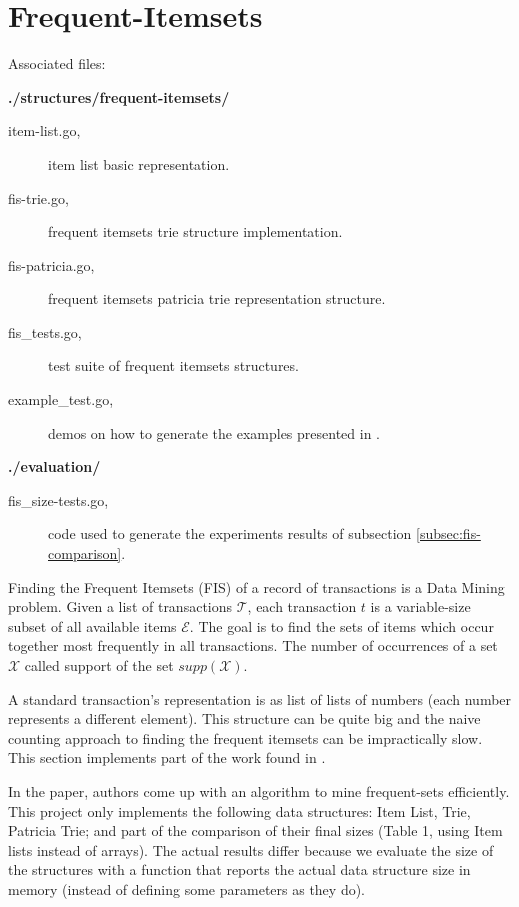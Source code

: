 \documentclass[a4paper,10pt,table,xcdraw]{article}
\begin{document}
\section{Frequent-Itemsets}
\label{sec:fis}

Associated files:

\textbf{./structures/frequent-itemsets/}
\begin{description}
\item [\hspace{10mm} item-list.go,] item list basic representation.
\item [\hspace{10mm} fis-trie.go,] frequent itemsets trie  structure implementation.
\item [\hspace{10mm} fis-patricia.go,] frequent itemsets patricia trie representation structure.
\item [\hspace{10mm} fis\_tests.go,] test suite of frequent itemsets structures.
\item [\hspace{10mm} example\_test.go,] demos on how to generate the examples presented in \cite{Pietracaprina2003}.
\end{description}
\textbf{./evaluation/}
\begin{description}
\item [\hspace{10mm} fis\_size-tests.go,] code used to generate the experiments results of subsection \ref{subsec:fis-comparison}.
\end{description}


Finding the Frequent Itemsets (FIS) of a record of transactions is a Data Mining problem. Given a list of transactions $\mathcal{T}$, each transaction $t$ is a variable-size subset of all available items $\mathcal{E}$. The goal is to find the sets of items which occur together most frequently in all transactions. The number of occurrences of a set $\mathcal{X}$ called support of the set $supp(\mathcal{X})$.

A standard transaction's representation is as list of lists of numbers (each number represents a different element). This structure can be quite big and the naive counting approach to finding the frequent itemsets can be impractically slow. This section implements part of the work found in \cite{Pietracaprina2003}.

In the paper, authors come up with an algorithm to mine frequent-sets efficiently. This project only implements the following data structures: Item List, Trie, Patricia Trie; and part of the comparison of their final sizes (Table 1, using Item lists instead of arrays). The actual results differ because we evaluate the size of the structures with a function that reports the actual data structure size in memory (instead of defining some parameters as they do).
\end{document}
